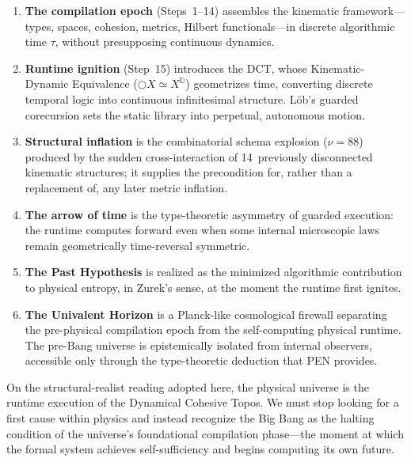\documentclass[11pt,a4paper]{article}
\theoremstyle{plain}
\theoremstyle{definition}
\theoremstyle{remark}
\newcommand{\D}{\mathbb{D}}
\newcommand{\nextmod}{\bigcirc}
\begin{document}
\begin{enumerate}[nosep]
    \item \textbf{The compilation epoch} (Steps~1--14) assembles the kinematic framework---types, spaces, cohesion, metrics, Hilbert functionals---in discrete algorithmic time $\tau$, without presupposing continuous dynamics.
    \item \textbf{Runtime ignition} (Step~15) introduces the DCT, whose Kinematic-Dynamic Equivalence ($\nextmod X \simeq X^{\D}$) geometrizes time, converting discrete temporal logic into continuous infinitesimal structure.
    L\"ob's guarded corecursion sets the static library into perpetual, autonomous motion.
    \item \textbf{Structural inflation} is the combinatorial schema explosion ($\nu = 88$) produced by the sudden cross-interaction of 14~previously disconnected kinematic structures; it supplies the precondition for, rather than a replacement of, any later metric inflation.
    \item \textbf{The arrow of time} is the type-theoretic asymmetry of guarded execution: the runtime computes forward even when some internal microscopic laws remain geometrically time-reversal symmetric.
    \item \textbf{The Past Hypothesis} is realized as the minimized algorithmic contribution to physical entropy, in Zurek's sense, at the moment the runtime first ignites.
    \item \textbf{The Univalent Horizon} is a Planck-like cosmological firewall separating the pre-physical compilation epoch from the self-computing physical runtime.
    The pre-Bang universe is epistemically isolated from internal observers, accessible only through the type-theoretic deduction that PEN provides.
\end{enumerate}

On the structural-realist reading adopted here, the physical universe is the runtime execution of the Dynamical Cohesive Topos.
We must stop looking for a first cause within physics and instead recognize the Big Bang as the halting condition of the universe's foundational compilation phase---the moment at which the formal system achieves self-sufficiency and begins computing its own future.
\end{document}
